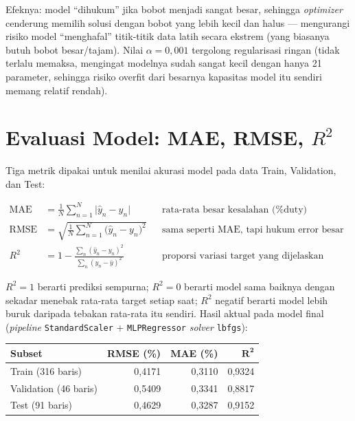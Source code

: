 \documentclass[11pt,a4paper]{article}
\begin{document}
Efeknya: model ``dihukum'' jika bobot menjadi sangat besar, sehingga \emph{optimizer}
cenderung memilih solusi dengan bobot yang lebih kecil dan halus --- mengurangi risiko
model ``menghafal'' titik-titik data latih secara ekstrem (yang biasanya butuh bobot
besar/tajam). Nilai $\alpha=0{,}001$ tergolong regularisasi ringan (tidak terlalu
memaksa, mengingat modelnya sudah sangat kecil dengan hanya 21 parameter, sehingga risiko
overfit dari besarnya kapasitas model itu sendiri memang relatif rendah).

\section{Evaluasi Model: MAE, RMSE, $R^2$}
\label{sec:eval}

Tiga metrik dipakai untuk menilai akurasi model pada data Train, Validation, dan Test:

\begin{formulabox}
\begin{align}
  \mathrm{MAE} &= \frac{1}{N}\sum_{n=1}^{N} \big|\hat{y}_n - y_n\big|
  &&\text{rata-rata besar kesalahan (\% duty)} \\
  \mathrm{RMSE} &= \sqrt{\frac{1}{N}\sum_{n=1}^{N} \big(\hat{y}_n - y_n\big)^2}
  &&\text{sama seperti MAE, tapi hukum error besar lebih keras} \\
  R^2 &= 1 - \frac{\sum_n (\hat{y}_n - y_n)^2}{\sum_n (y_n - \bar{y})^2}
  &&\text{proporsi variasi target yang dijelaskan model}
\end{align}
\end{formulabox}

$R^2=1$ berarti prediksi sempurna; $R^2=0$ berarti model sama baiknya dengan sekadar
menebak rata-rata target setiap saat; $R^2$ negatif berarti model lebih buruk daripada
tebakan rata-rata itu sendiri. Hasil aktual pada model final (\emph{pipeline}
\texttt{StandardScaler} + \texttt{MLPRegressor} \emph{solver} \texttt{lbfgs}):

\begin{center}
\begin{tabular}{@{}l r r r@{}}
\toprule
\textbf{Subset} & \textbf{RMSE (\%)} & \textbf{MAE (\%)} & $\bm{R^2}$ \\
\midrule
Train (316 baris)      & 0,4171 & 0,3110 & 0,9324 \\
Validation (46 baris)  & 0,5409 & 0,3341 & 0,8817 \\
Test (91 baris)        & 0,4629 & 0,3287 & 0,9152 \\
\bottomrule
\end{tabular}
\end{center}
\end{document}
